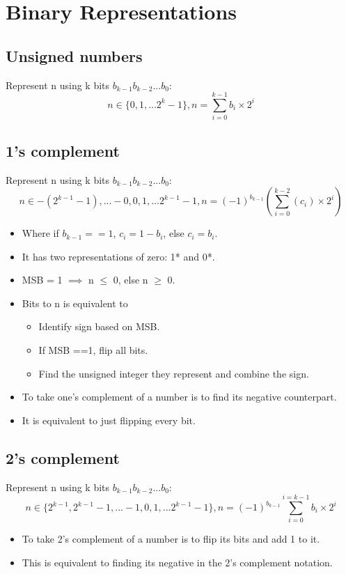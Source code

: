 \documentclass{report}
\begin{document}
\section{Binary Representations}
\subsection{Unsigned numbers}
Represent n using k bits $b_{k-1}b_{k-2}...b_0$:
\begin{equation}
n \in \{0,1,...2^{k}-1\}, n = \sum_{i=0}^{k-1}b_i\times2^{i}
\end{equation}
\subsection{1's complement}
Represent n using k bits $b_{k-1}b_{k-2}...b_0$:
\begin{equation}
n \in {-(2^{k-1}-1),...-0,0,1,...2^{k-1}-1}, n = (-1)^{b_{k-1}}(\sum_{i=0}^{k-2} (c_i) \times 2^{i})
\end{equation} 
\begin{itemize}
\item Where if $b_{k-1}==1$, $c_i=1-b_i$, else $c_i=b_i$.
\item It has two representations of zero: 1* and 0*.
\item MSB = 1 $\implies$ n $\leq$ 0, else n $\geq$ 0.
\item Bits to n is equivalent to 
\begin{itemize}
    \item Identify sign based on MSB.
    \item If MSB ==1, flip all bits.
    \item Find the unsigned integer they represent and combine the sign.
\end{itemize}
\item To take one's complement of a number is to find its negative counterpart.
\item It is equivalent to just flipping every bit.
\end{itemize}
\subsection{2's complement}
Represent n using k bits $b_{k-1}b_{k-2}...b_0$:
\begin{equation}
n \in \{2^{k-1}, 2^{k-1}-1, ... -1,0,1,...2^{k-1}-1\}, n = (-1)^{b_{k-1}}\sum_{i=0}^{i=k-1} b_i \times 2^i
\end{equation}
\begin{itemize}
\item To take 2's complement of a number is to flip its bits and add 1 to it.
\item This is equivalent to finding its negative in the 2's complement notation.
\end{itemize}
\end{document}
